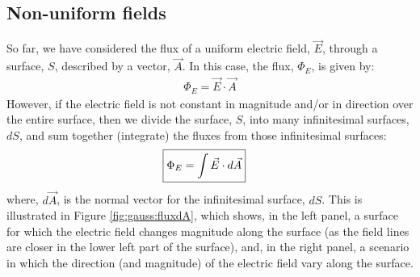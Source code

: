 \subsection{Non-uniform fields}
So far, we have considered the flux of a uniform electric field, $\vec E$, through a surface, $S$, described by a vector, $\vec A$. In this case, the flux, $\Phi_E$, is given by:
\begin{align*}
\Phi_E=\vec E\cdot \vec A
\end{align*}
However, if the electric field is not constant in magnitude and/or in direction over the entire surface, then we divide the surface, $S$, into many infinitesimal surfaces, $dS$, and sum together (integrate) the fluxes from those infinitesimal surfaces:
\begin{align*}
\Aboxed{\Phi_E=\int \vec E\cdot d\vec A}
\end{align*}
where, $d\vec A$, is the normal vector for the infinitesimal surface, $dS$. This is illustrated in Figure \ref{fig:gauss:fluxdA}, which shows, in the left panel, a surface for which the electric field changes magnitude along the surface (as the field lines are closer in the lower left part of the surface), and, in the right panel, a scenario in which the direction (and magnitude) of the electric field vary along the surface.

